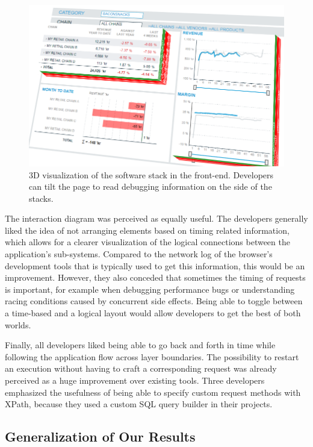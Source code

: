 \begin{figure}
	\centering
		\includegraphics[width=1.00\linewidth]{img/pos3d.png}
	\caption{3D visualization of the software stack in the front-end. Developers can tilt the page to read debugging information on the side of the stacks.}
	\label{fig:3d}
\end{figure}

The interaction diagram was perceived as equally useful.
The developers generally liked the idea of not arranging elements based on timing related information, which allows for a clearer visualization of the logical connections between the application's sub-systems.
Compared to the network log of the browser's development tools that is typically used to get this information, this would be an improvement.
However, they also conceded that sometimes the timing of requests is important, for example when debugging performance bugs or understanding racing conditions caused by concurrent side effects.
Being able to toggle between a time-based and a logical layout would allow developers to get the best of both worlds.

Finally, all developers liked being able to go back and forth in time while following the application flow across layer boundaries.
The possibility to restart an execution without having to craft a corresponding request was already perceived as a huge improvement over existing tools.
Three developers emphasized the usefulness of being able to specify custom request methods with XPath, because they used a custom SQL query builder in their projects.

\subsection{Generalization of Our Results}

